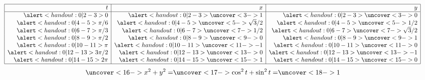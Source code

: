 \begin{frame}
\begin{example}[Example 2, p. 658]
\begin{columns}[c]
\[
\begin{array}{|r|r|r|}
\hline
t & x & y\\
\hline
\alert<handout:0| 2-3>{0} &%
\alert<handout:0| 2-3>{\uncover<3->{1}} &%
\alert<handout:0| 2-3>{\uncover<3->{0}} \\%
\alert<handout:0| 4-5>{\pi / 6} &%
\alert<handout:0| 4-5>{\uncover<5->{\sqrt{3}/ 2}} &%
\alert<handout:0| 4-5>{\uncover<5->{1/2}} \\%
\alert<handout:0| 6-7>{\pi / 3} &%
\alert<handout:0| 6-7>{\uncover<7->{1/2}} &%
\alert<handout:0| 6-7>{\uncover<7->{\sqrt{3}/2}} \\%
\alert<handout:0| 8-9>{\pi /2} &%
\alert<handout:0| 8-9>{\uncover<9->{0}} &%
\alert<handout:0| 8-9>{\uncover<9->{1}} \\%
\alert<handout:0| 10-11>{\pi} &%
\alert<handout:0| 10-11>{\uncover<11->{-1}} &%
\alert<handout:0| 10-11>{\uncover<11->{0}} \\%
\alert<handout:0| 12-13>{3\pi/2} &%
\alert<handout:0| 12-13>{\uncover<13->{0}} &%
\alert<handout:0| 12-13>{\uncover<13->{-1}} \\%
\alert<handout:0| 14-15>{2\pi} &%
\alert<handout:0| 14-15>{\uncover<15->{1}} &%
\alert<handout:0| 14-15>{\uncover<15->{0}} \\%
\hline
\end{array}
\]
\abovedisplayskip=2pt
\belowdisplayskip=2pt
\[
\uncover<16->{%
x^2 + y^2 = %
}%
\uncover<17->{%
\cos^2 t+ \sin^2 t = %
}%
\uncover<18->{%
1%
}%
\]
%
\end{columns}
\end{example}
\end{frame}
